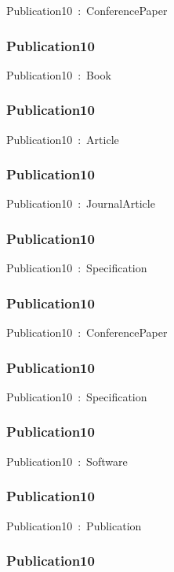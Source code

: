 \documentclass{article}
\begin{document}
Publication10~:~ConferencePaper

\subsubsection*{Publication10}

Publication10~:~Book

\subsubsection*{Publication10}

Publication10~:~Article

\subsubsection*{Publication10}

Publication10~:~JournalArticle

\subsubsection*{Publication10}

Publication10~:~Specification

\subsubsection*{Publication10}

Publication10~:~ConferencePaper

\subsubsection*{Publication10}

Publication10~:~Specification

\subsubsection*{Publication10}

Publication10~:~Software

\subsubsection*{Publication10}

Publication10~:~Publication

\subsubsection*{Publication10}
\end{document}
